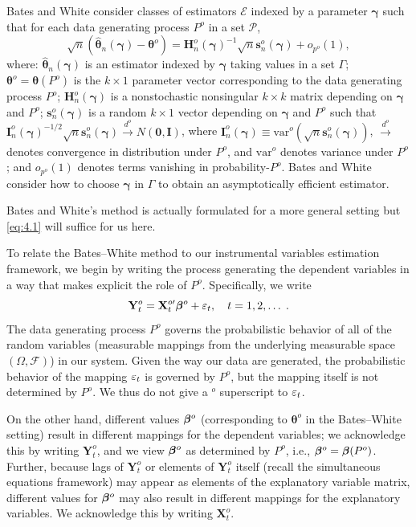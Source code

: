 Bates and White consider classes of estimators $\mathcal{E}$ indexed by a parameter
$\boldsymbol{\gamma}$ such that for each data generating process $P^o$ in a set $\mathcal{P}$,
\begin{equation}\label{eq:4.1}
\sqrt{n}(\hat{\boldsymbol{\theta}}_n(\boldsymbol{\gamma}) - \boldsymbol{\theta}^o) = \mathbf{H}_n^o(\boldsymbol{\gamma})^{-1}\sqrt{n}\mathbf{s}_n^o(\boldsymbol{\gamma}) + o_{p^o}(1),
\end{equation}
where: $\hat{\boldsymbol{\theta}}_n(\boldsymbol{\gamma})$ is an estimator indexed by $\boldsymbol{\gamma}$ taking values in a set $\Gamma$; $\boldsymbol{\theta}^o = \boldsymbol{\theta}(P^o)$ is the $k \times 1$ parameter vector corresponding to the data generating
process $P^o$; $\mathbf{H}_n^o(\boldsymbol{\gamma})$ is a nonstochastic nonsingular $k \times k$ matrix depending
on $\boldsymbol{\gamma}$ and $P^o$; $\mathbf{s}_n^o(\boldsymbol{\gamma})$ is a random $k \times 1$ vector depending on $\boldsymbol{\gamma}$ and $P^o$ such
that $\mathbf{I}_n^o(\boldsymbol{\gamma})^{-1/2}\sqrt{n}\mathbf{s}_n^o(\boldsymbol{\gamma}) \xrightarrow{d^o} N(\mathbf{0}, \mathbf{I})$, where $\mathbf{I}_n^o(\boldsymbol{\gamma}) \equiv \mathrm{var}^o(\sqrt{n}\mathbf{s}_n^o(\boldsymbol{\gamma}))$, $\xrightarrow{d^o}$
denotes convergence in distribution under $P^o$, and $\mathrm{var}^o$ denotes variance
under $P^o$; and $o_{p^o}(1)$ denotes terms vanishing in probability-$P^o$. Bates and
White consider how to choose $\boldsymbol{\gamma}$ in $\Gamma$ to obtain an asymptotically efficient
estimator.

Bates and White's method is actually formulated for a more general
setting but \eqref{eq:4.1} will suffice for us here.

To relate the Bates--White method to our instrumental variables estimation framework, we begin by writing the process generating the dependent
variables in a way that makes explicit the role of $P^o$. Specifically, we write
\[
\mathbf{Y}_t^o = \mathbf{X}_t^{o\prime}\boldsymbol{\beta}^o + \varepsilon_t, \quad t = 1, 2, \ldots\;.
\]
The data generating process $P^o$ governs
the probabilistic behavior of all of the random variables (measurable mappings from the underlying measurable space $(\Omega, \mathcal{F})$) in our system. Given
the way our data are generated, the probabilistic behavior of the mapping
$\varepsilon_t$ is governed by $P^o$, but the mapping itself is not determined by $P^o$. We
thus do not give a ${}^o$ superscript to $\varepsilon_t$.

On the other hand, different values $\boldsymbol{\beta}^o$ (corresponding to $\boldsymbol{\theta}^o$ in the Bates--White setting) result in different mappings for the dependent variables; we
acknowledge this by writing $\mathbf{Y}_t^o$, and we view $\boldsymbol{\beta}^o$ as determined by $P^o$,
i.e., $\boldsymbol{\beta}^o = \boldsymbol{\beta}(P^o)$. Further, because lags of $\mathbf{Y}_t^o$ or elements of $\mathbf{Y}_t^o$ itself
(recall the simultaneous equations framework) may appear as elements of
the explanatory variable matrix, different values for $\boldsymbol{\beta}^o$ may also result in
different mappings for the explanatory variables. We acknowledge this by
writing $\mathbf{X}_t^o$.

